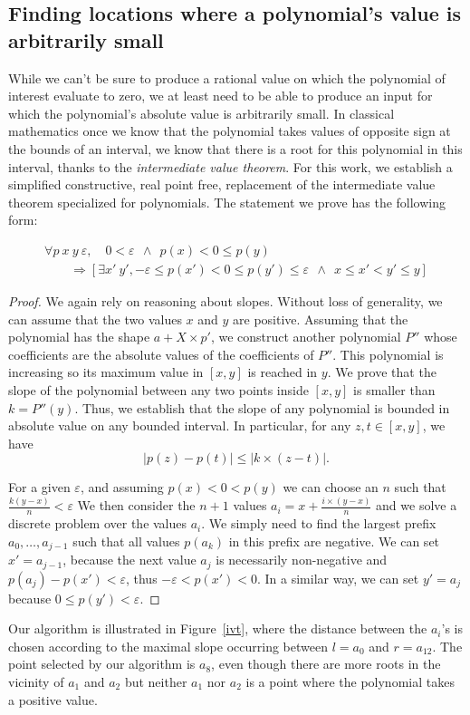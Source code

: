 \documentclass{mscs}
\begin{document}
\subsection{Finding locations where a polynomial's value is
  arbitrarily small}
\label{ssec:civt}
While we can't be sure to produce a rational value on which the
polynomial of interest evaluate to zero, we at least need to be
able to produce an input for which the polynomial's absolute value is
arbitrarily small. In classical mathematics once we know that the
polynomial takes values of opposite sign at the bounds of an interval,
we know that there is a root for this polynomial in this interval,
thanks to the {\em intermediate value theorem}. For this work, we establish
a simplified constructive, real point free, replacement of the intermediate value
theorem specialized for polynomials.  The statement we prove has the following
form:
\begin{theorem}
\[
\begin{array}{l}
{\forall p~x~y~\varepsilon,\quad 0 < \varepsilon~~\wedge~~p(x) < 0 \leq p(y)}\\
\qquad\Rightarrow [\exists x'~ y', -\varepsilon \leq p(x') < 0 \leq p(y') \leq
\varepsilon ~~\wedge~~
x \leq x' < y' \leq y]
\end{array}
\]
\end{theorem}
\begin{proof}
We again rely on reasoning about slopes. Without loss of generality,
we can assume that the two values \(x\) and \(y\) are positive. Assuming
that the polynomial has the shape \(a + X \times p'\), we construct
another
polynomial \(P''\) whose coefficients are the absolute values of the
coefficients of \(P''\).  This polynomial is increasing so its maximum
value in \([x,y]\) is reached in \(y\).   We prove that the slope
of the polynomial between any two points inside \([x,y]\) is smaller than
\(k  = P''(y)\).  Thus, we establish that the
slope of any polynomial is bounded in absolute value on any bounded
interval.  In particular, for any \(z, t\in [x,y]\), we have
\[|p(z)-p(t)| \leq |k \times (z - t)|.\]

For a given \(\varepsilon\), and assuming \(p(x) < 0 < p(y)\) we can
choose an \(n\) such that \(\frac{k(y-x)}{n} < \varepsilon\)
 We then consider the
\(n+1\) values \(a_i = x + \frac{i\times (y-x)}{n}\) and we solve a
discrete problem over the values \(a_i\).  We simply need to find the
largest prefix \(a_0, \ldots, a_{j-1}\) such that all values \(p(a_k)\) in this
prefix are negative.  We can set \(x' =a_{j-1}\), because the next
value \(a_j\) is necessarily non-negative and
\(p(a_j) - p(x') < \varepsilon\), thus \(-\varepsilon < p(x') < 0\).
In a similar way, we can set \(y'= a_j\) because \(0 \leq p(y') < \varepsilon\).
\end{proof}
Our algorithm is illustrated in Figure~\ref{ivt}, where the distance
between the \(a_i\)'s is chosen according to the maximal slope
occurring between \(l=a_0\) and \(r=a_{12}\). The point selected by
our algorithm is \(a_8\), even though there are more roots in the
vicinity of \(a_1\) and \(a_2\) but neither \(a_1\) nor \(a_2\) is a
point where the polynomial takes a positive value.
\end{document}
